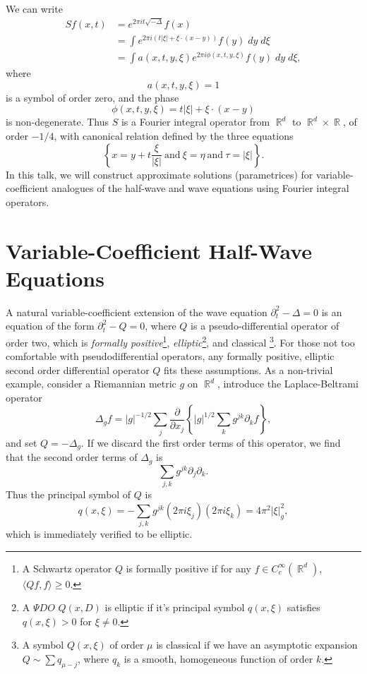 \documentclass{article}
\theoremstyle{plain}
\theoremstyle{remark}
\theoremstyle{definition}
\DeclareMathOperator{\RR}{\mathbb{R}}
\begin{document}
We can write
%
\begin{align*}
	Sf(x,t) &= e^{2 \pi it \sqrt{-\Delta}} f(x)\\
	&= \int e^{2 \pi i (t |\xi| + \xi \cdot (x - y))} f(y)\; dy\; d\xi\\
	&= \int a(x,t,y,\xi) e^{2 \pi i \phi(x,t,y,\xi)} f(y)\; dy\; d\xi,
\end{align*}
%
where
%
\[ a(x,t,y,\xi) = 1 \]
%
is a symbol of order zero, and the phase
%
\[ \phi(x,t,y,\xi) = t |\xi| + \xi \cdot (x - y) \]
%
is non-degenerate. Thus $S$ is a Fourier integral operator from $\RR^d$ to $\RR^d \times \RR$, of order $-1/4$, with canonical relation defined by the three equations
%
\[ \left\{ x = y + t \frac{\xi}{|\xi|}\ \text{and}\ \xi = \eta\ \text{and}\ \tau = |\xi| \right\}. \]
%
In this talk, we will construct approximate solutions (parametrices) for variable-coefficient analogues of the half-wave and wave equations using Fourier integral operators.

\section{Variable-Coefficient Half-Wave Equations}

A natural variable-coefficient extension of the wave equation $\partial_t^2 - \Delta = 0$ is an equation of the form $\partial_t^2 - Q = 0$, where $Q$ is a pseudo-differential operator of order two, which is \emph{formally positive}\footnote{A Schwartz operator $Q$ is formally positive if for any $f \in C_c^\infty(\RR^d)$, $\langle Qf, f \rangle \geq 0$.}, \emph{elliptic}\footnote{A ${\Psi}DO$ $Q(x,D)$ is elliptic if it's principal symbol $q(x,\xi)$ satisfies $q(x,\xi) > 0$ for $\xi \neq 0$.}, and classical \footnote{A symbol $Q(x,\xi)$ of order $\mu$ is classical if we have an asymptotic expansion $Q \sim \sum q_{\mu-j}$, where $q_k$ is a smooth, homogeneous function of order $k$.}. For those not too comfortable with pseudodifferential operators, any formally positive, elliptic second order differential operator $Q$ fits these assumptions. As a non-trivial example, consider a Riemannian metric $g$ on $\RR^d$, introduce the Laplace-Beltrami operator
%
\[ \Delta_g f = |g|^{-1/2} \sum_j \frac{\partial}{\partial x_j} \left\{ |g|^{1/2} \sum_k g^{jk} \partial_k f \right\}, \]
%
and set $Q = - \Delta_g$. If we discard the first order terms of this operator, we find that the second order terms of $\Delta_g$ is
%
\[ \sum_{j,k} g^{jk} \partial_j \partial_k. \]
%
Thus the principal symbol of $Q$ is
%
\[ q(x,\xi) = - \sum_{j,k} g^{jk} ( 2 \pi i \xi_j ) (2 \pi i \xi_k) = 4 \pi^2 |\xi|_g^2, \]
%
which is immediately verified to be elliptic.
\end{document}
